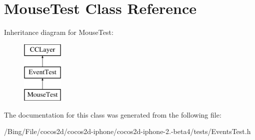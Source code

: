 \hypertarget{interface_mouse_test}{\section{Mouse\-Test Class Reference}
\label{interface_mouse_test}
}
Inheritance diagram for Mouse\-Test\-:\begin{figure}[H]
\begin{center}
\leavevmode
\includegraphics[height=3.000000cm]{interface_mouse_test}
\end{center}
\end{figure}


The documentation for this class was generated from the following file\-:\begin{DoxyCompactItemize}
\item 
/\-Bing/\-File/cocos2d/cocos2d-\/iphone/cocos2d-\/iphone-\/2.-\/beta4/tests/Events\-Test.\-h\end{DoxyCompactItemize}
